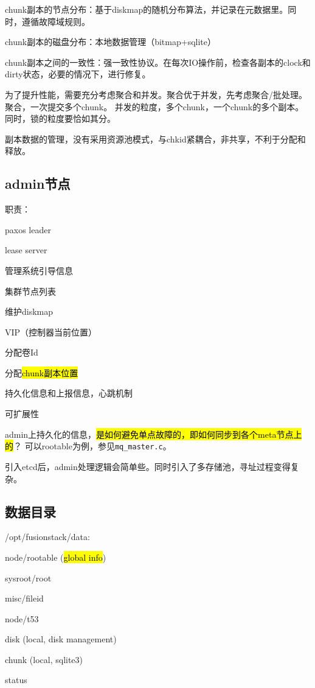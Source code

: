 chunk副本的节点分布：基于diskmap的随机分布算法，并记录在元数据里。同时，遵循故障域规则。

chunk副本的磁盘分布：本地数据管理（bitmap+sqlite）

chunk副本之间的一致性：强一致性协议。在每次IO操作前，检查各副本的clock和dirty状态，必要的情况下，进行修复。

为了提升性能，需要充分考虑聚合和并发。聚合优于并发，先考虑聚合/批处理。
聚合，一次提交多个chunk。
并发的粒度，多个chunk，一个chunk的多个副本。同时，锁的粒度要恰如其分。

副本数据的管理，没有采用资源池模式，与chkid紧耦合，非共享，不利于分配和释放。

\subsection{admin节点}

职责：
\begin{compactenum}
\item paxos leader
\item lease server
\item 管理系统引导信息
\item 集群节点列表
\item 维护diskmap
\item VIP（控制器当前位置）
\item 分配卷Id
\item 分配\hl{chunk副本位置}
\end{compactenum}

持久化信息和上报信息，心跳机制

可扩展性

admin上持久化的信息，\hl{是如何避免单点故障的，即如何同步到各个meta节点上的}？
可以rootable为例，参见\verb|mq_master.c|。

引入etcd后，admin处理逻辑会简单些。同时引入了多存储池，寻址过程变得复杂。

\subsection{数据目录}

/opt/fusionstack/data:
\begin{itembox}
\item node/rootable (\hl{global info})
    \begin{compactitem}
    \item sysroot/root
    \item misc/fileid
    \item node/t53
    \end{compactitem}
\item disk (local, disk management)
\item chunk (local, sqlite3)
\item status
\end{itembox}

